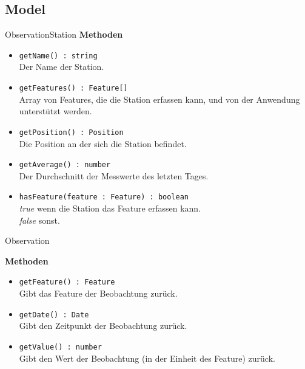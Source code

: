 \subsection{Model}

    \begin{Class}{ObservationStation}
        \textbf{Methoden}
        \begin{itemize}
            \item \texttt{getName() : string}
            \\ Der Name der Station.
            \item \texttt{getFeatures() : Feature[]}
            \\ Array von Features, die die Station erfassen kann, und von der Anwendung unterstützt werden.
            \item \texttt{getPosition() : Position}
            \\ Die Position an der sich die Station befindet.
            \item \texttt{getAverage() : number}
            \\ Der Durchschnitt der Messwerte des letzten Tages.
            \item \texttt{hasFeature(feature : Feature) : boolean}
            \\ \emph{true} wenn die Station das Feature erfassen kann.
            \\ \emph{false} sonst.
        \end{itemize}
    \end{Class}

    \begin{Class}{Observation}
        
        \textbf{Methoden}
        \begin{itemize}
            \item \texttt{getFeature() : Feature}
            \\ Gibt das Feature der Beobachtung zurück.
            \item \texttt{getDate() : Date}
            \\ Gibt den Zeitpunkt der Beobachtung zurück.
            \item \texttt{getValue() : number}
            \\ Gibt den Wert der Beobachtung (in der Einheit des Feature) zurück.
        \end{itemize}
    \end{Class}

